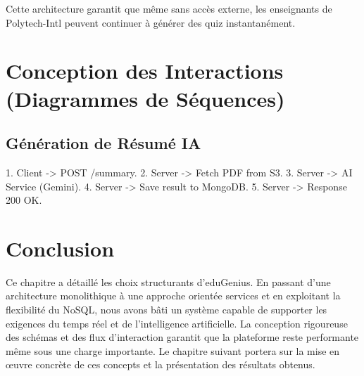 Cette architecture garantit que même sans accès externe, les enseignants de Polytech-Intl peuvent continuer à générer des quiz instantanément.

\section{Conception des Interactions (Diagrammes de Séquences)}
\subsection{Génération de Résumé IA}
1. Client -> POST /summary.
2. Server -> Fetch PDF from S3.
3. Server -> AI Service (Gemini).
4. Server -> Save result to MongoDB.
5. Server -> Response 200 OK.

\section{Conclusion}
Ce chapitre a détaillé les choix structurants d'eduGenius. En passant d'une architecture monolithique à une approche orientée services et en exploitant la flexibilité du NoSQL, nous avons bâti un système capable de supporter les exigences du temps réel et de l'intelligence artificielle. La conception rigoureuse des schémas et des flux d'interaction garantit que la plateforme reste performante même sous une charge importante. Le chapitre suivant portera sur la mise en œuvre concrète de ces concepts et la présentation des résultats obtenus.
